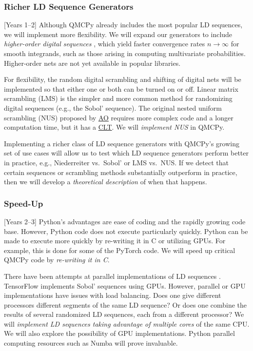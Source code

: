 \documentclass[11pt]{NSFamsart}
\newcommand{\AO}{\hyperlink{AOlink}{AO}\xspace}
\newcommand{\CLT}{\hyperlink{CLTlink}{CLT}\xspace}
\newcommand{\TensorFlow}{TensorFlow\xspace}
\newcommand{\PyTorch}{PyTorch\xspace}
\begin{document}
\subsubsection{Richer LD Sequence Generators } [Years 1--2] \label{sec:richLD}
Although QMCPy already includes the most popular LD sequences, we will implement more flexibility.  We will expand our generators to include \emph{higher-order digital sequences} \cite{Dic09a, Dic11a}, which yield  faster convergence rates  $n \to \infty$ for smooth integrands, such as those arising in computing multivariate probabilities.  Higher-order nets are not yet available in popular libraries.

For flexibility, the random digital scrambling and shifting of digital nets will be implemented so that either one or both can be turned on or off.  Linear matrix scrambling (LMS) \cite{Mat98,HonHic00a} is the simpler and more common method for randomizing digital sequences (e.g., the Sobol' sequence).  The original nested uniform scrambling (NUS) proposed by \AO \cite{Owe95} requires more complex code and a longer computation time, but it has a \CLT  \cite{Loh01}.  We will \emph{implement NUS} in QMCPy.

Implementing a richer class of LD sequence generators with QMCPy's growing set of use cases will allow us to test which LD sequence generators perform better in practice, e.g., Niederreiter vs.\ Sobol' or LMS vs.\ NUS. If we detect that certain sequences or scrambling methods substantially outperform in practice, then we will develop a \emph{theoretical description} of when that happens.

\subsubsection{Speed-Up} [Years 2--3] \label{sec:speedup}
Python's advantages are ease of coding and the rapidly growing code base.  However, Python code does not execute particularly quickly.  Python can be made to execute more quickly by re-writing it in C or utilizing GPUs.  For example, this is done for some of the \PyTorch code.  We will speed up critical QMCPy code by \emph{re-writing it in C}.

There have been attempts at parallel implementations of LD sequences \cite{LiMul00a,OktSri02, SchUhl01,WanEtal06a,LiuHic04a}.  \TensorFlow \cite{tfqf2021a} implements Sobol' sequences using GPUs.  However, parallel or GPU implementations have issues with load balancing. Does one give different processors different segments of the same LD sequence?  Or does one combine the results of several randomized LD sequences, each from a different processor?  We will \emph{implement LD sequences taking advantage of multiple cores} of the same CPU.  We will also explore the possibility of GPU implementations.  Python parallel computing resources \cite{ParallelPython} such as Numba \cite{Numba} will prove invaluable.
\end{document}
